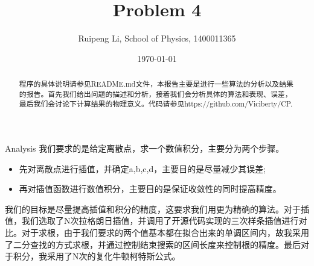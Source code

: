 \documentclass[letterpaper,12pt]{article}
\begin{document}
\title{Problem 4}
\author{Ruipeng Li, School of Physics, 1400011365}
\date{\today}
\maketitle

\begin{abstract}	

程序的具体说明请参见README.md文件，本报告主要是进行一些算法的分析以及结果的报告。首先我们给出问题的描述和分析，接着我们会分析具体的算法和表现、误差，最后我们会讨论下计算结果的物理意义。代码请参见https://github.com/Viciberty/CP.

\end{abstract}

\begin{section}{Analysis}
	我们要求的是给定离散点，求一个数值积分，主要分为两个步骤。
	\begin{itemize}
		\item 先对离散点进行插值，并确定a,b,c,d，主要目的是尽量减少其误差;
		\item 再对插值函数进行数值积分，主要目的是保证收敛性的同时提高精度。
	\end{itemize}\par
	我们的目标是尽量提高插值和积分的精度，这要求我们用更为精确的算法。对于插值，我们选取了N次拉格朗日插值，并调用了开源代码实现的三次样条插值进行对比。对于求根，由于我们要求的两个值基本都在拟合出来的单调区间内，故我采用了二分查找的方式求根，并通过控制结束搜索的区间长度来控制根的精度。最后对于积分，我采用了N次的复化牛顿柯特斯公式。\par
\end{section}
\end{document}
